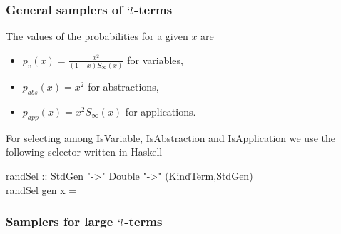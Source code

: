 \documentclass{sig-alternate}
\begin{document}
\subsubsection*{General samplers of $`l$-terms}
The values of the probabilities for a given $x$ are
\begin{itemize}
\item $p_v(x) = \frac{x^2}{(1-x) S_\infty(x)}$ for variables,
\item $p_{abs}(x) = x^2$ for abstractions,
\item $p_{app}(x) = x^2 S_\infty (x)$ for applications.
\end{itemize}
For selecting among \<IsVariable\>, \<IsAbstraction\> and \<IsApplication\> we use
the following selector written in \textsf{Haskell}
\begin{haskell}
  \hspace*{-10pt}randSel :: StdGen "->" Double "->" (KindTerm,StdGen)\\
  \hspace*{-10pt}randSel gen x = 
\end{haskell}

\subsubsection*{Samplers for large $`l$-terms}
\end{document}
